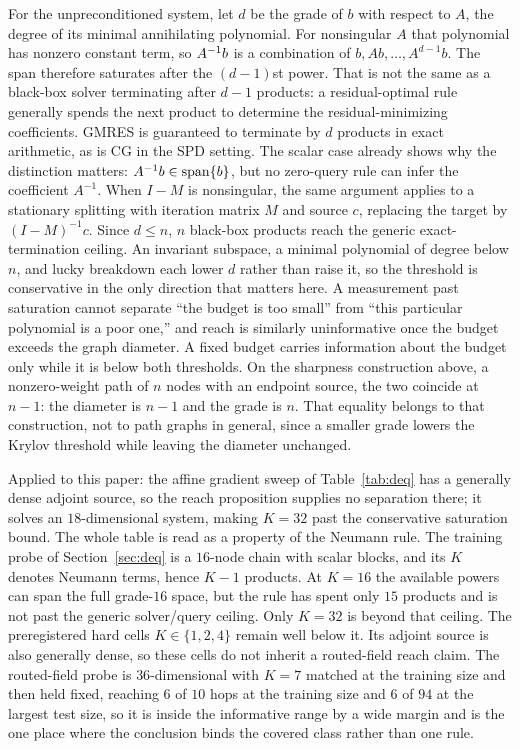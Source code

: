 \begin{remark}
\label{rem:saturation}
For the unpreconditioned system, let $d$ be the grade of $b$ with respect to
$A$, the degree of its minimal annihilating polynomial. For nonsingular $A$
that polynomial has nonzero constant term, so $A^{-1}b$ is a combination of
$b,Ab,\dots,A^{d-1}b$. The span therefore saturates after the $(d-1)$st
power. That is not the same as a black-box solver terminating after $d-1$
products: a residual-optimal rule generally spends the next product to
determine the residual-minimizing coefficients. GMRES \citep{saad1986gmres}
is guaranteed to terminate by $d$ products in exact arithmetic, as is CG in
the SPD setting. The scalar case already
shows why the distinction matters: $A^{-1}b\in\operatorname{span}\{b\}$, but no zero-query
rule can infer the coefficient $A^{-1}$. When $I-M$ is nonsingular, the same
argument applies to a stationary splitting with iteration matrix $M$ and
source $c$, replacing the target by $(I-M)^{-1}c$.
Since $d\leq n$, $n$ black-box products reach the generic exact-termination
ceiling. An invariant
subspace, a minimal polynomial of degree below $n$, and lucky breakdown each
lower $d$ rather than raise it, so the threshold is conservative in the only
direction that matters here. A measurement past saturation cannot separate
``the budget is too small'' from ``this particular polynomial is a poor one,''
and reach is similarly uninformative once the budget exceeds the graph
diameter. A fixed budget carries information about the budget only while it is
below both thresholds. On the sharpness construction above, a nonzero-weight
path of $n$ nodes with an endpoint source, the two coincide at $n-1$: the
diameter is $n-1$ and the grade is $n$. That equality belongs to that
construction, not to path graphs in general, since a smaller grade lowers the
Krylov threshold while leaving the diameter unchanged.
\end{remark}

Applied to this paper: the affine gradient sweep of Table~\ref{tab:deq} has a
generally dense adjoint source, so the reach proposition supplies no separation
there; it solves an $18$-dimensional system, making $K=32$ past the conservative
saturation bound. The whole table is read as a property of the Neumann rule.
The training probe of Section~\ref{sec:deq} is a $16$-node chain with scalar
blocks, and its $K$ denotes Neumann terms, hence $K-1$ products. At $K=16$ the
available powers can span the full grade-$16$ space, but the rule has spent
only $15$ products and is not past the generic solver/query ceiling. Only
$K=32$ is beyond that ceiling. The preregistered hard cells
$K\in\{1,2,4\}$ remain well below it. Its adjoint source is also
generally dense, so these cells do not inherit a routed-field reach claim. The
routed-field probe is $36$-dimensional with $K=7$ matched at the training size
and then held fixed, reaching $6$ of $10$ hops at the training size and $6$ of $94$ at the largest
test size, so it is inside the informative range by a wide margin and is the
one place where the conclusion binds the covered class rather than one rule.


